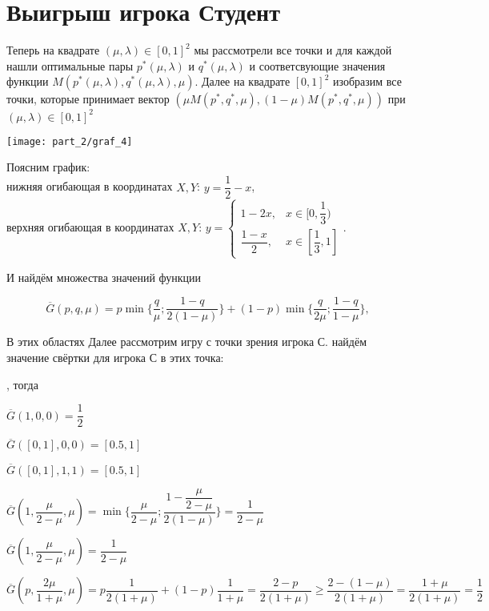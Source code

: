 \section{Выигрыш игрока Студент}

Теперь на квадрате $(\mu, \lambda) \in [0, 1]^2$ мы рассмотрели все точки
и для каждой нашли оптимальные пары $p^*(\mu, \lambda)$
и $q^*(\mu, \lambda)$ и соответсвующие значения функции 
$M(p^*(\mu, \lambda),q^*(\mu, \lambda),\mu)$. Далее на квадрате
$[0, 1]^{2}$ изобразим все точки, которые принимает вектор $(\mu M(p^*,q^*,\mu), (1-\mu) M(p^*,q^*,\mu))$ при
$(\mu, \lambda)\in[0, 1]^{2}$

\begin{center}
\texttt{[image: part\_2/graf\_4]}
\end{center}

Поясним график: \\
нижняя огибающая в координатах $X,Y$: $y=\dfrac{1}{2}-x$, \\
верхняя огибающая в координатах $X,Y$: 
$y=
\begin{cases}
	1 - 2x, & x \in [0, \dfrac{1}{3}) \\
	\dfrac{1 - x}{2}, & x \in [\dfrac{1}{3}, 1]
\end{cases}.
$

И найдём множества значений функции 

$$
	\overline G(p, q, \mu)=
	p \min \{
		\dfrac{q}{\mu};
		\dfrac{1-q}{2(1-\mu)}
	\} + (1 - p) \min \{
		\dfrac{q}{2\mu};
		\dfrac{1 - q}{1 - \mu}
	\},
$$

В этих областях
Далее рассмотрим игру с точки зрения игрока С. 
найдём значение свёртки для игрока С в этих точка:

, тогда

$
	\overline G(1, 0, 0) = \dfrac{1}{2}
$

$
	\overline G([0, 1], 0, 0) = [0.5, 1]
$

$	
	\overline G([0, 1], 1, 1) = [0.5, 1]
$

$
	\overline G(1, \dfrac{\mu}{2 - \mu}, \mu)=
	\min \big\{
		\dfrac{\mu}{2 - \mu}; 
		\dfrac{1 - \dfrac{\mu}{2 - \mu}}{2(1 - \mu)}
	\big\}
	=\dfrac{1}{2 - \mu}
$

$
	\overline G(1,\dfrac{\mu}{2-\mu},\mu)=\dfrac{1}{2-\mu}
$

$
	\overline G(p,\dfrac{2\mu}{1+\mu},\mu) =
	p\dfrac{1}{2(1 + \mu)} + (1 - p)\dfrac{1}{1 + \mu}=
	\dfrac{2 - p}{2(1 + \mu)} \geqslant
	\dfrac{2 - (1 - \mu)}{2(1 + \mu)} =
	\dfrac{1 + \mu}{2(1 + \mu)} =
	\dfrac{1}{2}
$

